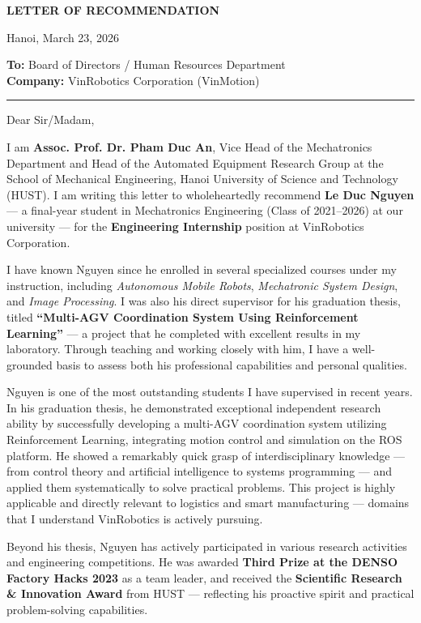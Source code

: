 \documentclass[11pt,a4paper]{article}
\begin{document}
\begin{center}
  {\Large\bfseries LETTER OF RECOMMENDATION}
\end{center}

\vspace{0.3em}

Hanoi, March 23, 2026

\textbf{To:} Board of Directors / Human Resources Department\\
\textbf{Company:} VinRobotics Corporation (VinMotion)

\noindent\rule{\textwidth}{0.4pt}

Dear Sir/Madam,

I am \textbf{Assoc. Prof. Dr. Pham Duc An}, Vice Head of the Mechatronics Department and Head of the Automated Equipment Research Group at the School of Mechanical Engineering, Hanoi University of Science and Technology (HUST). I am writing this letter to wholeheartedly recommend \textbf{Le Duc Nguyen} --- a final-year student in Mechatronics Engineering (Class of 2021--2026) at our university --- for the \textbf{Engineering Internship} position at VinRobotics Corporation.

I have known Nguyen since he enrolled in several specialized courses under my instruction, including \textit{Autonomous Mobile Robots}, \textit{Mechatronic System Design}, and \textit{Image Processing}. I was also his direct supervisor for his graduation thesis, titled \textbf{``Multi-AGV Coordination System Using Reinforcement Learning''} --- a project that he completed with excellent results in my laboratory. Through teaching and working closely with him, I have a well-grounded basis to assess both his professional capabilities and personal qualities.

Nguyen is one of the most outstanding students I have supervised in recent years. In his graduation thesis, he demonstrated exceptional independent research ability by successfully developing a multi-AGV coordination system utilizing Reinforcement Learning, integrating motion control and simulation on the ROS platform. He showed a remarkably quick grasp of interdisciplinary knowledge --- from control theory and artificial intelligence to systems programming --- and applied them systematically to solve practical problems. This project is highly applicable and directly relevant to logistics and smart manufacturing --- domains that I understand VinRobotics is actively pursuing.

Beyond his thesis, Nguyen has actively participated in various research activities and engineering competitions. He was awarded \textbf{Third Prize at the DENSO Factory Hacks 2023} as a team leader, and received the \textbf{Scientific Research \& Innovation Award} from HUST --- reflecting his proactive spirit and practical problem-solving capabilities.
\end{document}
